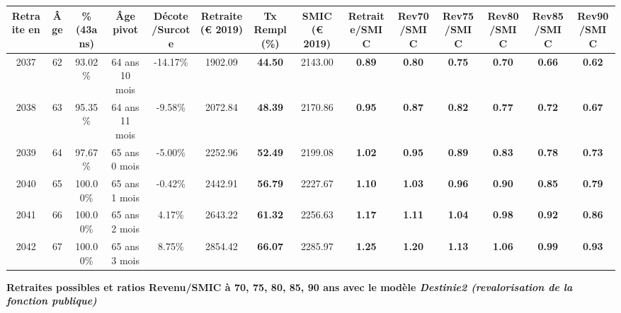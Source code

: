 \begin{adjustbox}{max width=\textwidth} 
\begin{tabular}[htb]{|c|c||c|c|c||c|c||c||c|c|c|c|c|c|} 
\hline 
 Retraite en &  Âge &  \%(43ans) &  Âge pivot &  Décote/Surcote &  Retraite (\euro{} 2019) &  Tx Rempl(\%) &  SMIC (\euro{} 2019) &  Retraite/SMIC &  Rev70/SMIC &  Rev75/SMIC &  Rev80/SMIC &  Rev85/SMIC &  Rev90/SMIC \\ 
\hline \hline 
 2037 &  62 &  93.02\% &  64 ans 10 mois &  -14.17\% &  1902.09 &  {\bf 44.50} &  2143.00 &  {\bf {\color{red} 0.89}} &  {\bf {\color{red} 0.80}} &  {\bf {\color{red} 0.75}} &  {\bf {\color{red} 0.70}} &  {\bf {\color{red} 0.66}} &  {\bf {\color{red} 0.62}} \\ 
\hline 
 2038 &  63 &  95.35\% &  64 ans 11 mois &  -9.58\% &  2072.84 &  {\bf 48.39} &  2170.86 &  {\bf {\color{red} 0.95}} &  {\bf {\color{red} 0.87}} &  {\bf {\color{red} 0.82}} &  {\bf {\color{red} 0.77}} &  {\bf {\color{red} 0.72}} &  {\bf {\color{red} 0.67}} \\ 
\hline 
 2039 &  64 &  97.67\% &  65 ans 0 mois &  -5.00\% &  2252.96 &  {\bf 52.49} &  2199.08 &  {\bf 1.02} &  {\bf {\color{red} 0.95}} &  {\bf {\color{red} 0.89}} &  {\bf {\color{red} 0.83}} &  {\bf {\color{red} 0.78}} &  {\bf {\color{red} 0.73}} \\ 
\hline 
 2040 &  65 &  100.00\% &  65 ans 1 mois &  -0.42\% &  2442.91 &  {\bf 56.79} &  2227.67 &  {\bf 1.10} &  {\bf 1.03} &  {\bf {\color{red} 0.96}} &  {\bf {\color{red} 0.90}} &  {\bf {\color{red} 0.85}} &  {\bf {\color{red} 0.79}} \\ 
\hline 
 2041 &  66 &  100.00\% &  65 ans 2 mois &  4.17\% &  2643.22 &  {\bf 61.32} &  2256.63 &  {\bf 1.17} &  {\bf 1.11} &  {\bf 1.04} &  {\bf {\color{red} 0.98}} &  {\bf {\color{red} 0.92}} &  {\bf {\color{red} 0.86}} \\ 
\hline 
 2042 &  67 &  100.00\% &  65 ans 3 mois &  8.75\% &  2854.42 &  {\bf 66.07} &  2285.97 &  {\bf 1.25} &  {\bf 1.20} &  {\bf 1.13} &  {\bf 1.06} &  {\bf {\color{red} 0.99}} &  {\bf {\color{red} 0.93}} \\ 
\hline 
\hline 
\end{tabular} 
\end{adjustbox} 
 
 \vspace{0.1cm} 
{\bf \noindent Retraites possibles et ratios Revenu/SMIC à 70, 75, 80, 85, 90 ans avec le modèle \emph{Destinie2 (revalorisation de la fonction publique)}}  
 
